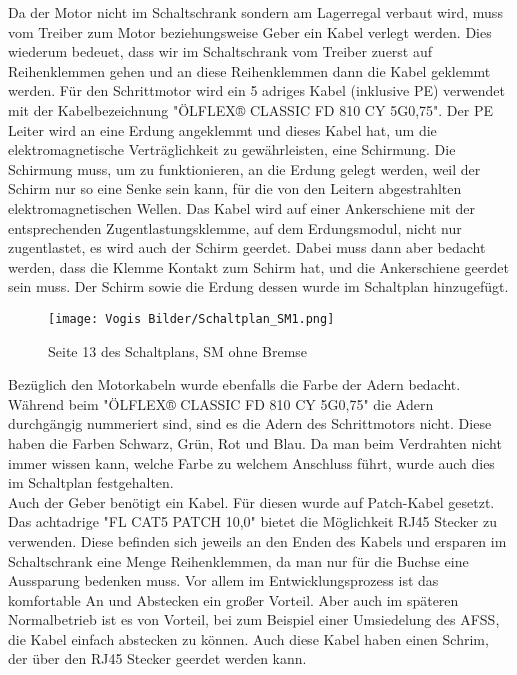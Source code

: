    Da der Motor nicht im Schaltschrank sondern am Lagerregal verbaut wird, muss vom Treiber zum Motor beziehungsweise Geber ein Kabel verlegt werden. Dies wiederum bedeuet, dass wir im Schaltschrank vom Treiber zuerst auf Reihenklemmen gehen und an diese Reihenklemmen dann die Kabel geklemmt werden. Für den Schrittmotor wird ein 5 adriges Kabel (inklusive PE) verwendet mit der Kabelbezeichnung "ÖLFLEX® CLASSIC FD 810 CY 5G0,75". Der PE Leiter wird an eine Erdung angeklemmt und dieses Kabel hat, um die elektromagnetische Verträglichkeit zu gewährleisten, eine Schirmung. Die Schirmung muss, um zu funktionieren, an die Erdung gelegt werden, weil der Schirm nur so eine Senke sein kann, für die von den Leitern abgestrahlten elektromagnetischen Wellen. Das Kabel wird auf einer Ankerschiene mit der entsprechenden Zugentlastungsklemme, auf dem Erdungsmodul, nicht nur zugentlastet, es wird auch der Schirm geerdet. Dabei muss dann aber bedacht werden, dass die Klemme Kontakt zum Schirm hat, und die Ankerschiene geerdet sein muss. Der Schirm sowie die Erdung dessen wurde im Schaltplan hinzugefügt.\\    
    \begin{figure}[h]
        \centering
        \texttt{[image: Vogis Bilder/Schaltplan\_SM1.png]}
        \caption{Seite 13 des Schaltplans, SM ohne Bremse}
        \label{fig:SMohneBremse}
    \end{figure}
    Bezüglich den Motorkabeln wurde ebenfalls die Farbe der Adern bedacht. Während beim "ÖLFLEX® CLASSIC FD 810 CY 5G0,75" die Adern durchgängig nummeriert sind, sind es die Adern des Schrittmotors nicht. Diese haben die Farben Schwarz, Grün, Rot und Blau. Da man beim Verdrahten nicht immer wissen kann, welche Farbe zu welchem Anschluss führt, wurde auch dies im Schaltplan festgehalten.\cite{Nema_SM_Kontaktbezeichnung}\\
    Auch der Geber benötigt ein Kabel. Für diesen wurde auf Patch-Kabel gesetzt. Das achtadrige "FL CAT5 PATCH 10,0" bietet die Möglichkeit RJ45 Stecker zu verwenden. Diese befinden sich jeweils an den Enden des Kabels und ersparen im Schaltschrank eine Menge Reihenklemmen, da man nur für die Buchse eine Aussparung bedenken muss. Vor allem im Entwicklungsprozess ist das komfortable An und Abstecken ein großer Vorteil. Aber auch im späteren Normalbetrieb ist es von Vorteil, bei zum Beispiel einer Umsiedelung des AFSS, die Kabel einfach abstecken zu können. Auch diese Kabel haben einen Schrim, der über den RJ45 Stecker geerdet werden kann.\\\\
